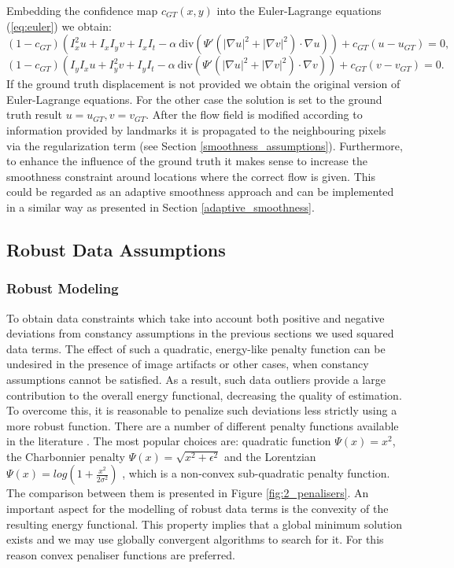 Embedding the confidence map $c_{GT}(x,y)$ into the Euler-Lagrange equations (\ref{eq:euler}) we obtain:
$$ (1 - c_{GT}) (I^2_x u + I_x I_y v + I_x I_t - \alpha \: \textrm{div} (\Psi'(|\nabla u|^2 + |\nabla v|^2) \cdot \nabla u )) + c_{GT}(u - u_{GT}) = 0, $$
$$ (1 - c_{GT}) (I_y I_x u + I^2_y v + I_y I_t - \alpha \: \textrm{div} (\Psi'(|\nabla u|^2 + |\nabla v|^2) \cdot \nabla v )) + c_{GT}(v - v_{GT}) = 0. $$
If the ground truth displacement is not provided we obtain the original version of Euler-Lagrange equations.
For the other case the solution is set to the ground truth result $u = u_{GT}, v = v_{GT} $. After the flow field is modified according to information provided by landmarks it is propagated to the neighbouring pixels via the regularization term (see Section \ref{smoothness_assumptions}). Furthermore, to enhance the influence of the ground truth it makes sense to increase the smoothness constraint around locations where the correct flow is given. This could be regarded as an adaptive smoothness approach and can be implemented in a similar way as presented in Section \ref{adaptive_smoothness}. 


\subsection{Robust Data Assumptions}


\subsubsection{Robust Modeling}
\label{robust}


To obtain data constraints which take into account both positive and negative deviations from constancy assumptions in the previous sections we used squared data terms. The effect of such a quadratic, energy-like penalty function can be undesired in the presence of image artifacts or other cases, when constancy assumptions cannot be satisfied.  As a result, such data outliers provide a large contribution to the overall energy functional, decreasing the quality of \opticalflow estimation. To overcome this, it is reasonable to penalize such deviations less strictly using a more robust function. There are a number of different penalty functions available in the literature \cite{Black91, Black96, Sun10, Middl}. The most popular choices are: quadratic function $ \Psi(x) = x^2 $, the Charbonnier penalty $\Psi(x) = \sqrt{x^2 + \epsilon^2} $ \cite{Charbonnier94} and the Lorentzian $\Psi(x) = log (1 + \frac{x^2}{2 \sigma^2}) $ \cite{Black96}, which is a non-convex sub-quadratic penalty function. The comparison between them is presented in Figure \ref{fig:2_penalisers}. An important aspect for the modelling of robust data terms is the convexity of the resulting energy functional.  This property implies that a global minimum solution exists and we may use globally convergent algorithms to search for it. For this reason convex penaliser functions are preferred.

